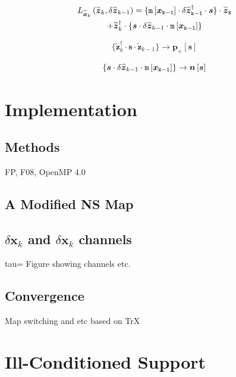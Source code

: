 \documentclass[letterpaper,twocolumn,amsmath,amsfont,amssymb,english,aps,jcp,preprintnumbers,groupaddress,nofootinbib,tightenlines]{revtex4}
\newcommand{\mat}[1]{\boldsymbol{#1}}
\begin{document}
\begin{multline}
{L}_{\widetilde{\mat{x}}_k}\left(\widetilde{\mat{z}}_{k} , \delta \widehat{\mat{z}}_{k-1} \right) = 
\{ \tt{m}\left[\mat{x}_{k-1} \right]  \cdot \delta {\widehat{\mat{z}}}^\dagger_{k-1} 
 \cdot \mat{s} \} \cdot \widetilde{\mat{z}}_{k} \\
+\widetilde{\mat{z}}^\dagger_{k} \cdot \{ \mat{s} \cdot \delta {\widehat{\mat{z}}}_{k-1}
\cdot \tt{m}\left[\mat{x}_{k-1} \right]    \} 
\end{multline}

\begin{equation}
 \{ \widetilde{\mat{z}}^\dagger_{k} \cdot \mat{s} \cdot  \widetilde{\mat{z}}_{k-1} \} 
\rightarrow \mat{p}_+\left[\mat{s} \right]
\end{equation}

\begin{equation}
\{ \mat{s} \cdot \delta {\widehat{\mat{z}}}_{k-1}
\cdot \tt{m}\left[\mat{x}_{k-1} \right]    \} 
\rightarrow \mat{n}\left[\mat{s} \right]
\end{equation}

\section{Implementation}

\subsection{Methods}
FP, F08, OpenMP 4.0

\subsection{A Modified NS Map}

\subsection{$\delta \mat{x}_k$ and $\delta \mat{x}_k$ channels}
tau= Figure showing channels etc.  

\subsection{Convergence}
Map switching and etc based on TrX


\section{Ill-Conditioned Support}
\end{document}
